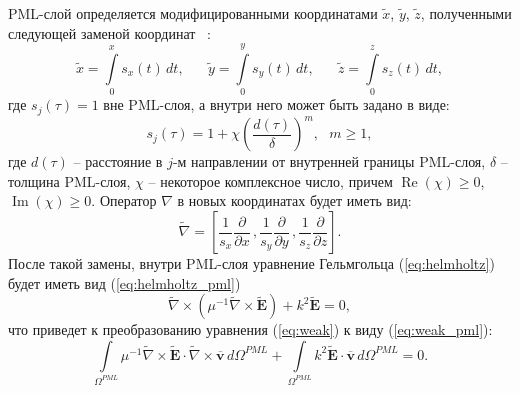 \documentclass[a4paper,14pt]{article}
\renewcommand{\Re}{\mathop{\mathrm{Re}}\nolimits}
\renewcommand{\Im}{\mathop{\mathrm{Im}}\nolimits}
\begin{document}
PML-слой определяется модифицированными координатами $\tilde{x}$, $\tilde{y}$, $\tilde{z}$, полученными следующей заменой координат ~\citep{wiik_dehoop_ursin}:
\begin{equation*}
	\tilde{x} = \int\limits_0^x s_x (t) \,dt ,
	\text{~~~~~}
	\tilde{y} = \int\limits_0^y s_y (t) \,dt ,
	\text{~~~~~}
	\tilde{z} = \int\limits_0^z s_z (t) \,dt ,
\end{equation*}
где $s_j(\tau) = 1$ вне PML-слоя, а внутри него может быть задано в виде:
\begin{equation}
	s_j(\tau) = 1 + \chi \left( \frac{d(\tau)}{\delta} \right)^m , \text{~~} m \geq 1 ,
	\label{eq:pml_s}
\end{equation}
где $d(\tau)$ -- расстояние в $j$-м направлении от внутренней границы PML-слоя, $\delta$ -- толщина PML-слоя, $\chi$ -- некоторое комплексное число, причем $\Re(\chi) \ge 0$, $\Im(\chi) \ge 0$. Оператор $\nabla$ в новых координатах будет иметь вид:
\begin{equation*}
	\tilde{\nabla} = \left[ \frac{1}{s_x} \frac{\partial}{\partial x} \,, \frac{1}{s_y} \frac{\partial}{\partial y} \,, \frac{1}{s_z} \frac{\partial}{\partial z} \right] .
\end{equation*}
После такой замены, внутри PML-слоя уравнение Гельмгольца (\ref{eq:helmholtz}) будет иметь вид (\ref{eq:helmholtz_pml})
\begin{equation}
	\tilde{\nabla} \times ( \mu^{-1} \tilde{\nabla} \times \tilde{\mathbf{E}} ) + k^{2} \tilde{\mathbf{E}} = 0 , \label{eq:helmholtz_pml}
\end{equation}
что приведет к преобразованию уравнения (\ref{eq:weak}) к виду (\ref{eq:weak_pml}):
\begin{equation}
	\int\limits_{{\Omega^{PML}}} \mu^{-1} \tilde{\nabla} \times \tilde{\mathbf{E}} \cdot \tilde{\nabla} \times \overline{\mathbf{v}} \,d{\Omega^{PML}} + \int\limits_{{\Omega^{PML}}} k^{2} \tilde{\mathbf{E}} \cdot \overline{\mathbf{v}} \,d{\Omega^{PML}} = 0 . \label{eq:weak_pml}
\end{equation}
\end{document}

